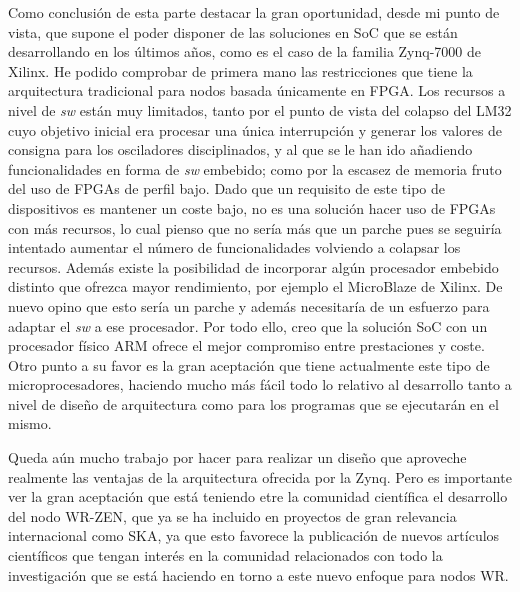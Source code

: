Como conclusión de esta parte destacar la gran oportunidad, desde mi punto de 
vista, que supone el poder disponer de las soluciones en SoC que se están 
desarrollando en los últimos años, como es el caso de la familia Zynq-7000 de 
Xilinx. He podido comprobar de primera mano las restricciones que tiene la 
arquitectura tradicional para nodos basada únicamente en FPGA. Los recursos a 
nivel de \textit{sw} están muy limitados, tanto por el punto de vista del 
colapso del LM32 cuyo objetivo inicial era procesar una única interrupción y 
generar los valores de consigna para los osciladores disciplinados, y al que se 
le han ido añadiendo funcionalidades en forma de \textit{sw} embebido; como por 
la escasez de memoria fruto del uso de FPGAs de perfil bajo. Dado que un 
requisito de este tipo de dispositivos es mantener un coste bajo, no es una 
solución hacer uso de FPGAs con más recursos, lo cual pienso que no sería más 
que un parche pues se seguiría intentado aumentar el número de funcionalidades 
volviendo a colapsar los recursos. Además existe la posibilidad de incorporar 
algún procesador embebido distinto que ofrezca mayor rendimiento, por ejemplo 
el MicroBlaze de Xilinx. De nuevo opino que esto sería un parche y además 
necesitaría de un esfuerzo para adaptar el \textit{sw} a ese procesador. Por 
todo ello, creo que la solución SoC con un procesador físico ARM ofrece el 
mejor compromiso entre prestaciones y coste. Otro punto a su favor es la gran 
aceptación que tiene actualmente este tipo de microprocesadores, haciendo mucho 
más fácil todo lo relativo al desarrollo tanto a nivel de diseño de 
arquitectura como para los programas que se ejecutarán en el mismo.

Queda aún mucho trabajo por hacer para realizar un diseño que aproveche 
realmente las ventajas de la arquitectura ofrecida por la Zynq. Pero es 
importante ver la gran aceptación que está teniendo etre la comunidad 
científica el desarrollo del nodo WR-ZEN, que ya se ha incluido en proyectos de 
gran relevancia internacional como SKA, ya que esto favorece la publicación de 
nuevos artículos científicos que tengan interés en la comunidad relacionados 
con todo la investigación que se está haciendo en torno a este nuevo enfoque 
para nodos WR.